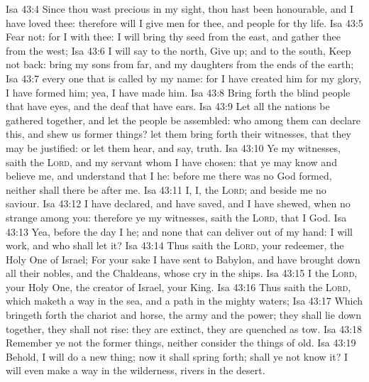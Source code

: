\vs Isa 43:4 Since thou wast precious in my sight, thou hast been honourable, and I have loved thee: therefore will I give men for thee, and people for thy life.
\vs Isa 43:5 Fear not: for I  with thee: I will bring thy seed from the east, and gather thee from the west;
\vs Isa 43:6 I will say to the north, Give up; and to the south, Keep not back: bring my sons from far, and my daughters from the ends of the earth;
\vs Isa 43:7  every one that is called by my name: for I have created him for my glory, I have formed him; yea, I have made him.
\vs Isa 43:8 Bring forth the blind people that have eyes, and the deaf that have ears.
\vs Isa 43:9 Let all the nations be gathered together, and let the people be assembled: who among them can declare this, and shew us former things? let them bring forth their witnesses, that they may be justified: or let them hear, and say,  truth.
\vs Isa 43:10 Ye  my witnesses, saith the \textsc{Lord}, and my servant whom I have chosen: that ye may know and believe me, and understand that I  he: before me there was no God formed, neither shall there be after me.
\vs Isa 43:11 I,  I,  the \textsc{Lord}; and beside me  no saviour.
\vs Isa 43:12 I have declared, and have saved, and I have shewed, when  no strange  among you: therefore ye  my witnesses, saith the \textsc{Lord}, that I  God.
\vs Isa 43:13 Yea, before the day  I  he; and  none that can deliver out of my hand: I will work, and who shall let it?
\vs Isa 43:14 Thus saith the \textsc{Lord}, your redeemer, the Holy One of Israel; For your sake I have sent to Babylon, and have brought down all their nobles, and the Chaldeans, whose cry  in the ships.
\vs Isa 43:15 I  the \textsc{Lord}, your Holy One, the creator of Israel, your King.
\vs Isa 43:16 Thus saith the \textsc{Lord}, which maketh a way in the sea, and a path in the mighty waters;
\vs Isa 43:17 Which bringeth forth the chariot and horse, the army and the power; they shall lie down together, they shall not rise: they are extinct, they are quenched as tow.
\vs Isa 43:18 Remember ye not the former things, neither consider the things of old.
\vs Isa 43:19 Behold, I will do a new thing; now it shall spring forth; shall ye not know it? I will even make a way in the wilderness,  rivers in the desert.
